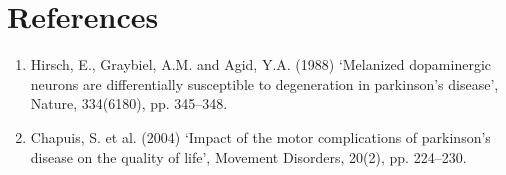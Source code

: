 \documentclass[12pt]{article}
\begin{document}
\section*{References}
\begin{enumerate}
	\item Hirsch, E., Graybiel, A.M. and Agid, Y.A. (1988) ‘Melanized dopaminergic neurons are differentially susceptible to degeneration in parkinson’s disease’, Nature, 334(6180), pp. 345–348.

	\item Chapuis, S. et al. (2004) ‘Impact of the motor complications of parkinson’s disease on the quality of life’, Movement Disorders, 20(2), pp. 224–230.


\end{enumerate}
\end{document}
